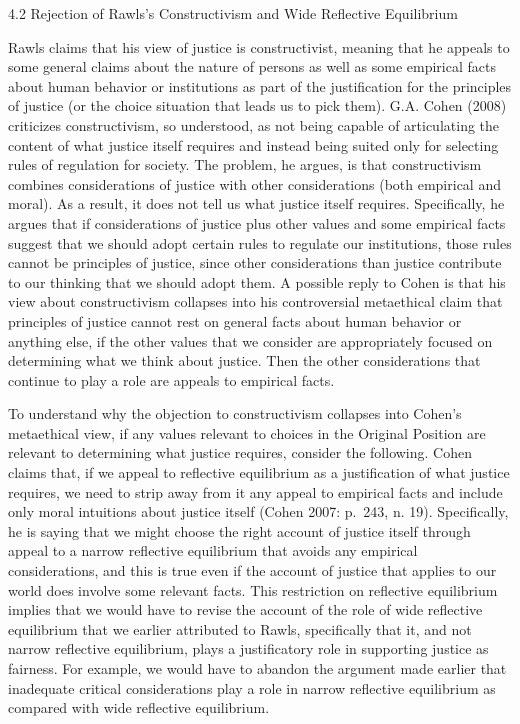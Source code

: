\documentclass[]{article}
\begin{document}
\protect\hypertarget{RejRawConWidRefEqu}{}{4.2 Rejection of Rawls's
Constructivism and Wide Reflective Equilibrium}

Rawls claims that his view of justice is constructivist, meaning that he
appeals to some general claims about the nature of persons as well as
some empirical facts about human behavior or institutions as part of the
justification for the principles of justice (or the choice situation
that leads us to pick them). G.A. Cohen (2008) criticizes
constructivism, so understood, as not being capable of articulating the
content of what justice itself requires and instead being suited only
for selecting rules of regulation for society. The problem, he argues,
is that constructivism combines considerations of justice with other
considerations (both empirical and moral). As a result, it does not tell
us what justice itself requires. Specifically, he argues that if
considerations of justice plus other values and some empirical facts
suggest that we should adopt certain rules to regulate our institutions,
those rules cannot be principles of justice, since other considerations
than justice contribute to our thinking that we should adopt them. A
possible reply to Cohen is that his view about constructivism collapses
into his controversial metaethical claim that principles of justice
cannot rest on general facts about human behavior or anything else, if
the other values that we consider are appropriately focused on
determining what we think about justice. Then the other considerations
that continue to play a role are appeals to empirical facts.

To understand why the objection to constructivism collapses into Cohen's
metaethical view, if any values relevant to choices in the Original
Position are relevant to determining what justice requires, consider the
following. Cohen claims that, if we appeal to reflective equilibrium as
a justification of what justice requires, we need to strip away from it
any appeal to empirical facts and include only moral intuitions about
justice itself (Cohen 2007: p.~243, n. 19). Specifically, he is saying
that we might choose the right account of justice itself through appeal
to a narrow reflective equilibrium that avoids any empirical
considerations, and this is true even if the account of justice that
applies to our world does involve some relevant facts. This restriction
on reflective equilibrium implies that we would have to revise the
account of the role of wide reflective equilibrium that we earlier
attributed to Rawls, specifically that it, and not narrow reflective
equilibrium, plays a justificatory role in supporting justice as
fairness. For example, we would have to abandon the argument made
earlier that inadequate critical considerations play a role in narrow
reflective equilibrium as compared with wide reflective equilibrium.
\end{document}
